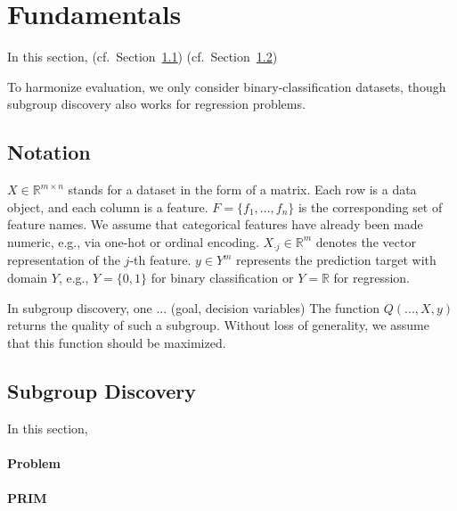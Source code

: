 \documentclass{article}
\theoremstyle{definition}
\begin{document}
\section{Fundamentals}
\label{sec:csd:fundamentals}

In this section, (cf.~Section~\ref{sec:csd:fundamentals:notation}) (cf.~Section~\ref{sec:csd:fundamentals:subgroup-discovery})

\cite{helal2016subgroup} \cite{herrera2011overview} \cite{atzmueller2015subgroup} \cite{ventura2018subgroup} \cite{meeng2021real}

To harmonize evaluation, we only consider binary-classification datasets, though subgroup discovery also works for regression problems.

\subsection{Notation}
\label{sec:csd:fundamentals:notation}

$X \in \mathbb{R}^{m \times n}$ stands for a dataset in the form of a matrix.
Each row is a data object, and each column is a feature.
$F = \{f_1, \dots, f_n\}$ is the corresponding set of feature names.
We assume that categorical features have already been made numeric, e.g., via one-hot or ordinal encoding.
$X_{\cdot{}j} \in \mathbb{R}^m$ denotes the vector representation of the $j$-th feature.
$y \in Y^m$ represents the prediction target with domain $Y$, e.g., $Y=\{0,1\}$ for binary classification or $Y=\mathbb{R}$ for regression.

In subgroup discovery, one ... (goal, decision variables)
The function $Q(...,X,y)$ returns the quality of such a subgroup.
Without loss of generality, we assume that this function should be maximized.

\subsection{Subgroup Discovery}
\label{sec:csd:fundamentals:subgroup-discovery}

In this section,

\paragraph{Problem}

\paragraph{PRIM}
\end{document}
